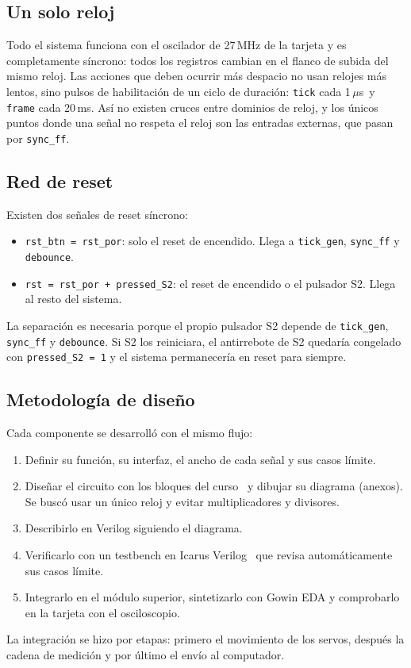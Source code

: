 \documentclass[conference]{IEEEtran}
\newcommand{\mo}[1]{\texttt{#1}}
\newcommand{\us}{\,$\mu$s}
\begin{document}
\subsection{Un solo reloj}
Todo el sistema funciona con el oscilador de 27\,MHz de la tarjeta y es completamente síncrono: todos los registros cambian en el flanco de subida del mismo reloj. Las acciones que deben ocurrir más despacio no usan relojes más lentos, sino pulsos de habilitación de un ciclo de duración: \mo{tick} cada 1\us\ y \mo{frame} cada 20\,ms. Así no existen cruces entre dominios de reloj, y los únicos puntos donde una señal no respeta el reloj son las entradas externas, que pasan por \mo{sync\_ff}.

\subsection{Red de reset}
Existen dos señales de reset síncrono:
\begin{itemize}
\item \mo{rst\_btn = rst\_por}: solo el reset de encendido. Llega a \mo{tick\_gen}, \mo{sync\_ff} y \mo{debounce}.
\item \mo{rst = rst\_por + pressed\_S2}: el reset de encendido o el pulsador S2. Llega al resto del sistema.
\end{itemize}
La separación es necesaria porque el propio pulsador S2 depende de \mo{tick\_gen}, \mo{sync\_ff} y \mo{debounce}. Si S2 los reiniciara, el antirrebote de S2 quedaría congelado con \mo{pressed\_S2 = 1} y el sistema permanecería en reset para siempre.

\subsection{Metodología de diseño}
Cada componente se desarrolló con el mismo flujo:
\begin{enumerate}
\item Definir su función, su interfaz, el ancho de cada señal y sus casos límite.
\item Diseñar el circuito con los bloques del curso~\cite{harris} y dibujar su diagrama (anexos). Se buscó usar un único reloj y evitar multiplicadores y divisores.
\item Describirlo en Verilog siguiendo el diagrama.
\item Verificarlo con un testbench en Icarus Verilog~\cite{icarus} que revisa automáticamente sus casos límite.
\item Integrarlo en el módulo superior, sintetizarlo con Gowin EDA y comprobarlo en la tarjeta con el osciloscopio.
\end{enumerate}
La integración se hizo por etapas: primero el movimiento de los servos, después la cadena de medición y por último el envío al computador.
\end{document}
